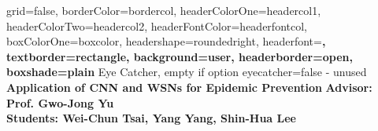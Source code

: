 \documentclass[a0paper,portrait]{baposter}
\begin{document}
\begin{CJK*}{UTF8}{bsmi}


\begin{poster}{
	grid=false,
	borderColor=bordercol,
	headerColorOne=headercol1,
	headerColorTwo=headercol2,
	headerFontColor=headerfontcol,
	boxColorOne=boxcolor,
	headershape=roundedright,
	headerfont=\Large\sf\bf,
	textborder=rectangle,
	background=user,
	headerborder=open,
  boxshade=plain
}
{
	Eye Catcher, empty if option eyecatcher=false - unused
}
{\sf\bf
    Application of CNN and WSNs for Epidemic Prevention
}
{
    \vspace{1em} \textbf{Advisor: Prof. Gwo-Jong Yu} \\
	\textbf{Students: Wei-Chun Tsai, Yang Yang, Shin-Hua Lee} \\
	
}
\end{poster}
\end{CJK*}
\end{document}
